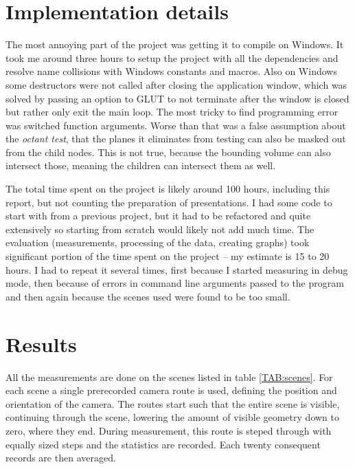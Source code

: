 \documentclass[report,11pt]{elsarticle}
\begin{document}
\section{\label{SEC:Pitfalls}Implementation details}
The most annoying part of the project was getting it to compile on Windows. It took me around three hours to setup the project with all the dependencies and resolve name collisions with Windows constants and macros. Also on Windows some destructors were not called after closing the application window, which was solved by passing an option to GLUT to not terminate after the window is closed but rather only exit the main loop. The most tricky to find programming error was switched function arguments. Worse than that was a false assumption about the \emph{octant test}, that the planes it eliminates from testing can also be masked out from the child nodes. This is not true, because the bounding volume can also intersect those, meaning the children can intersect them as well.

The total time spent on the project is likely around 100 hours, including this report, but not counting the preparation of presentations. I had some code to start with from a previous project, but it had to be refactored and quite extensively so starting from scratch would likely not add much time. The evaluation (measurements, processing of the data, creating graphs) took significant portion of the time spent on the project -- my estimate is 15 to 20 hours. I had to repeat it several times, first because I started measuring in debug mode, then because of errors in command line arguments passed to the program and then again because the scenes used were found to be too small.

\section{\label{SEC:Results}Results}
All the measurements are done on the scenes listed in table \ref{TAB:scenes}. For each scene a single prerecorded camera route is used, defining the position and orientation of the camera. The routes start such that the entire scene is visible, continuing through the scene, lowering the amount of visible geometry down to zero, where they end. During measurement, this route is steped through with equally sized steps and the statistics are recorded. Each twenty consequent records are then averaged.
\end{document}
